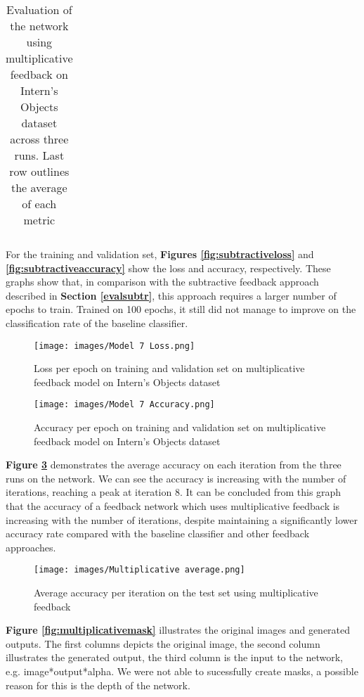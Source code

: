 \documentclass{l4proj}
\begin{document}
\begin{table}[H]
\begin{tabular}{|l|l|l|l|l|l|l|l|}
\end{tabular}
\caption{Evaluation of the network using multiplicative feedback on Intern's Objects dataset across three runs. Last row outlines the average of each metric}
\label{tab:multiplicative}
\end{table}

For the training and validation set, \textbf{Figures \ref{fig:subtractiveloss}} and \textbf{\ref{fig:subtractiveaccuracy}} show the loss and accuracy, respectively. These graphs show that, in comparison with the subtractive feedback approach described in \textbf{Section \ref{evalsubtr}}, this approach requires a larger number of epochs to train. Trained on 100 epochs, it still did not manage to improve on the classification rate of the baseline classifier.

\begin{figure}[H]
    \centering
    \texttt{[image: images/Model 7 Loss.png]}
    \caption{Loss per epoch on training and validation set on multiplicative feedback model on Intern's Objects dataset}
    \label{fig:multiplicativeloss} 
\end{figure}

\begin{figure}[H]
    \centering
    \texttt{[image: images/Model 7 Accuracy.png]}
    \caption{Accuracy per epoch on training and validation set on multiplicative feedback model on Intern's Objects dataset}
    \label{fig:multiplicativeaccuracy} 
\end{figure}

\textbf{Figure \ref{fig:multiplav}} demonstrates the average accuracy on each iteration from the three runs on the network. We can see the accuracy is increasing with the number of iterations, reaching a peak at iteration 8.
It can be concluded from this graph that the accuracy of a feedback network which uses multiplicative feedback is increasing with the number of iterations, despite maintaining a significantly lower accuracy rate compared with the baseline classifier and other feedback approaches.

\begin{figure}[H]
    \centering
    \texttt{[image: images/Multiplicative average.png]}
    \caption{Average accuracy per iteration on the test set using multiplicative feedback}
    \label{fig:multiplav} 
\end{figure}

\textbf{Figure \ref{fig:multiplicativemask}} illustrates the original images and generated outputs. The first columns depicts the original image, the second column illustrates the generated output, the third column is the input to the network, e.g. image*output*alpha. We were not able to sucessfully create masks, a possible reason for this is the depth of the network.
\end{document}
